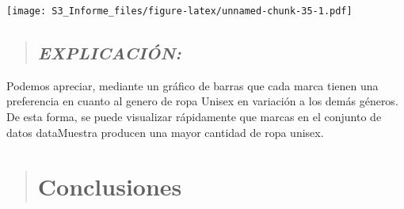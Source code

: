 \documentclass[
]{article}
\newenvironment{Shaded}{\begin{snugshade}}{\end{snugshade}}
\newcommand{\AttributeTok}[1]{\textcolor[rgb]{0.77,0.63,0.00}{#1}}
\newcommand{\DecValTok}[1]{\textcolor[rgb]{0.00,0.00,0.81}{#1}}
\newcommand{\FunctionTok}[1]{\textcolor[rgb]{0.00,0.00,0.00}{#1}}
\newcommand{\NormalTok}[1]{#1}
\newcommand{\OtherTok}[1]{\textcolor[rgb]{0.56,0.35,0.01}{#1}}
\newcommand{\SpecialCharTok}[1]{\textcolor[rgb]{0.00,0.00,0.00}{#1}}
\newcommand{\StringTok}[1]{\textcolor[rgb]{0.31,0.60,0.02}{#1}}
\begin{document}
\begin{Shaded}
\end{Shaded}

\texttt{[image: S3\_Informe\_files/figure-latex/unnamed-chunk-35-1.pdf]}

\begin{quote}
\hypertarget{explicaciuxf3n-11}{%
\subsection{\texorpdfstring{\textbf{\emph{EXPLICACIÓN:}}}{EXPLICACIÓN:}}\label{explicaciuxf3n-11}}
\end{quote}

Podemos apreciar, mediante un gráfico de barras que cada marca tienen
una preferencia en cuanto al genero de ropa Unisex en variación a los
demás géneros. De esta forma, se puede visualizar rápidamente que marcas
en el conjunto de datos dataMuestra producen una mayor cantidad de ropa
unisex.

\begin{quote}
\hypertarget{conclusiones}{%
\section{\texorpdfstring{\textbf{Conclusiones}}{Conclusiones}}\label{conclusiones}}
\end{quote}
\end{document}
